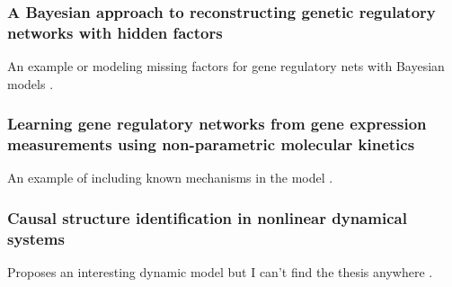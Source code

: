 \documentclass{article}
\begin{document}
    \subsubsection*{A Bayesian approach to reconstructing genetic regulatory networks with hidden factors}
        An example or modeling missing factors for gene regulatory nets with
        Bayesian models \cite{beal2005bayesian}.

    \subsubsection*{Learning gene regulatory networks from gene expression measurements using non-parametric molecular kinetics}
        An example of including known mechanisms in the model
        \cite{aijo2009learning}.
        
    \subsubsection*{Causal structure identification in nonlinear dynamical systems}
        Proposes an interesting dynamic model but I can't find the thesis  anywhere \cite{klemm2008causal}.

        




\end{document}
